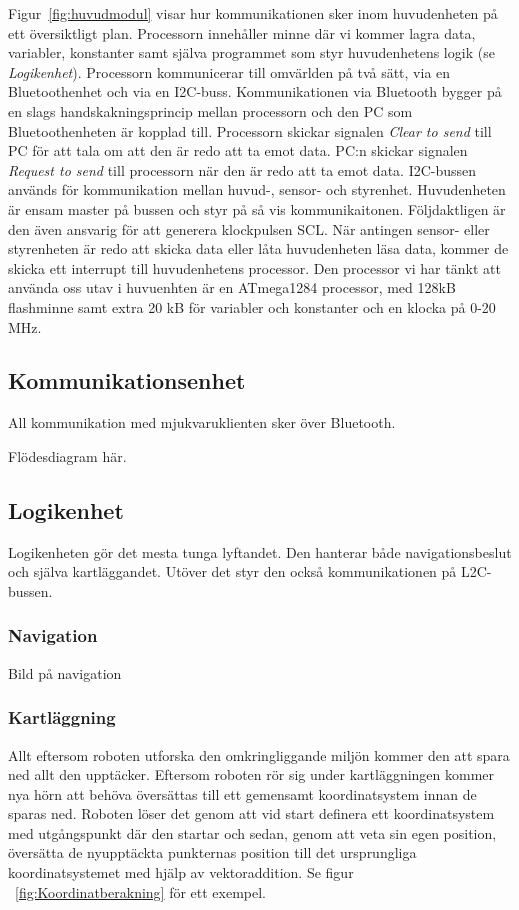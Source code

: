 \documentclass{article}
\begin{document}
Figur~\ref{fig:huvudmodul} visar hur kommunikationen sker inom huvudenheten på ett översiktligt plan. Processorn innehåller minne där vi kommer lagra data, variabler, konstanter samt själva programmet som styr huvudenhetens logik (se \textit{Logikenhet}). Processorn kommunicerar till omvärlden på två sätt, via en Bluetoothenhet och via en I2C-buss. Kommunikationen via Bluetooth bygger på en slags handskakningsprincip mellan processorn och den PC som Bluetoothenheten är kopplad till. Processorn skickar signalen \textit{Clear to send} till PC för att tala om att den är redo att ta emot data. PC:n skickar signalen \textit{Request to send} till processorn när den är redo att ta emot data. I2C-bussen används för kommunikation mellan huvud-, sensor- och styrenhet. Huvudenheten är ensam master på bussen och styr på så vis kommunikaitonen. Följdaktligen är den även ansvarig för att generera klockpulsen SCL. När antingen sensor- eller styrenheten är redo att skicka data eller låta huvudenheten läsa data, kommer de skicka ett interrupt till huvudenhetens processor. Den processor vi har tänkt att använda oss utav i huvuenhten är en ATmega1284 processor, med 128kB flashminne samt extra 20 kB för variabler och konstanter och en klocka på 0-20 MHz.
 
\subsection{Kommunikationsenhet}
All kommunikation med mjukvaruklienten sker över Bluetooth.

Flödesdiagram här.

\subsection{Logikenhet}
Logikenheten gör det mesta tunga lyftandet. Den hanterar både navigationsbeslut och själva kartläggandet. Utöver det styr den också kommunikationen på L2C-bussen.

\subsubsection{Navigation}
Bild på navigation

\subsubsection{Kartläggning}

Allt eftersom roboten utforska den omkringliggande miljön kommer den att spara ned allt den upptäcker. Eftersom roboten rör sig under kartläggningen kommer nya hörn att behöva översättas till ett gemensamt koordinatsystem innan de sparas ned. Roboten löser det genom att vid start definera ett koordinatsystem med utgångspunkt där den startar och sedan, genom att veta sin egen position, översätta de nyupptäckta punkternas position till det ursprungliga koordinatsystemet med hjälp av vektoraddition. Se figur ~\ref{fig:Koordinatberakning} för ett exempel.
\end{document}
